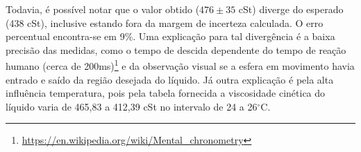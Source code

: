 Todavia, é possível notar que o valor obtido (\(476 \pm 35\) cSt) diverge do esperado (438 cSt), inclusive estando fora da margem de incerteza calculada. O erro percentual encontra-se em 9\%. Uma explicação para tal divergência é a baixa precisão das medidas, como o tempo de descida dependente do tempo de reação humano (cerca de 200ms)\footnote{\url{https://en.wikipedia.org/wiki/Mental_chronometry}} e da observação visual se a esfera em movimento havia entrado e saído da região desejada do líquido. Já outra explicação é pela alta influência temperatura, pois pela tabela fornecida a viscosidade cinética do líquido varia de 465,83 a 412,39 cSt no intervalo de 24 a 26\(^\circ\)C.


